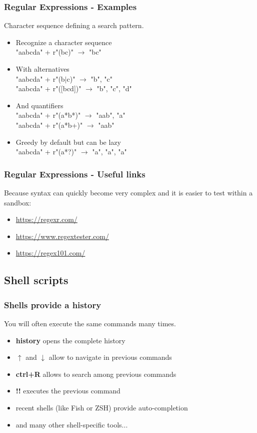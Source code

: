 \begin{frame}[fragile]
   \frametitle{Regular Expressions - Examples}
   Character sequence defining a search pattern.
   \begin{itemize}
      \item Recognize a character sequence \\
            "aabcda" + r"(bc)" $\rightarrow$ "bc"
      \item With alternatives \\
            "aabcda" + r"(b$|$c)" $\rightarrow$ "b", "c" \\
            "aabcda" + r"([bcd])" $\rightarrow$ "b", "c", "d"
      \item And quantifiers \\
            "aabcda" + r"(a*b*)" $\rightarrow$ "aab", "a" \\
            "aabcda" + r"(a*b+)" $\rightarrow$ "aab"
      \item Greedy by default but can be lazy \\
            "aabcda" + r"(a*?)" $\rightarrow$ "a", "a", "a"
   \end{itemize}
\end{frame}

\begin{frame}[fragile]
   \frametitle{Regular Expressions - Useful links}
   Because syntax can quickly become very complex and it is easier to test within a sandbox:
   \begin{itemize}
      \item \url{https://regexr.com/}
      \item \url{https://www.regextester.com/}
      \item \url{https://regex101.com/}
   \end{itemize}
\end{frame}

\subsection{Shell scripts}

\begin{frame}[fragile]
   \frametitle{Shells provide a history}
   You will often execute the same commands many times.
   \begin{itemize}
      \item {\bf history} opens the complete history
      \item $\uparrow$ and $\downarrow$ allow to navigate in previous commands
      \item {\bf ctrl+R} allows to search among previous commands
      \item {\bf !!} executes the previous command
      \item recent shells (like Fish or ZSH) provide auto-completion
      \item and many other shell-specific tools...
   \end{itemize}
\end{frame}

